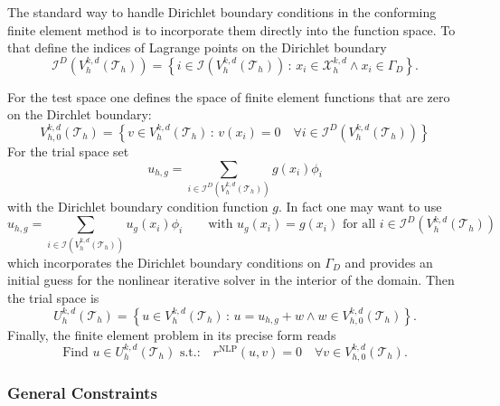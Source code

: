 \documentclass[a4paper,12pt]{article}
\begin{document}
The standard way to handle Dirichlet boundary conditions in the conforming
finite element method is to incorporate them directly into the function space. 
To that define the indices of Lagrange points on the Dirichlet boundary
\begin{equation*}
\mathcal{I}^D\left(V_h^{k,d}(\mathcal{T}_h)\right) = 
\left\{ i\in\mathcal{I}\left(V_h^{k,d}(\mathcal{T}_h)\right)  \,:\,
x_i\in\mathcal{X}_h^{k,d} \wedge x_i\in\Gamma_D  
\right\} .
\end{equation*}

For the test space one defines the space of finite element
functions that are zero on the Dirchlet boundary:
\begin{equation*}
V_{h,0}^{k,d}(\mathcal{T}_{h}) = \left\{ 
v\in V_{h}^{k,d}(\mathcal{T}_{h}) \,:\, v(x_i) = 0 
\quad \forall i\in\mathcal{I}^D\left(V_h^{k,d}(\mathcal{T}_h)\right)
 \right\}
\end{equation*}
For the trial space set
\begin{equation*}
u_{h,g} = \sum_{i\in \mathcal{I}^D\left(V_h^{k,d}(\mathcal{T}_h)\right)}
g(x_i) \phi_i
\end{equation*}
with the Dirichlet boundary condition function $g$. In fact one may want to
use
\begin{equation*}
u_{h,g} = \sum_{i\in \mathcal{I}\left(V_h^{k,d}(\mathcal{T}_h)\right)}
u_g(x_i) \phi_i \qquad \text{with $u_g(x_i)=g(x_i)$ for all $i\in 
\mathcal{I}^D\left(V_h^{k,d}(\mathcal{T}_h)\right)$}
\end{equation*}
which incorporates the Dirichlet boundary conditions on $\Gamma_D$
and provides an initial guess for the nonlinear iterative solver in the
interior of the domain. Then the trial space is
\begin{equation*}
U_{h}^{k,d}(\mathcal{T}_{h}) = \left\{ u\in V_h^{k,d}(\mathcal{T}_h)
\,:\, u = u_{h,g} + w \wedge w\in V_{h,0}^{k,d}(\mathcal{T}_{h})\right\} .
\end{equation*}
Finally, the finite element problem in its precise form reads
\begin{equation}
\text{Find $u\in U_{h}^{k,d}(\mathcal{T}_{h})$ s.t.:} 
\quad r^{\text{NLP}}(u,v)=0 \quad \forall v\in V_{h,0}^{k,d}(\mathcal{T}_{h}) .
\label{eq:PreciseFEProblem}
\end{equation}

\subsubsection*{General Constraints}
\end{document}
